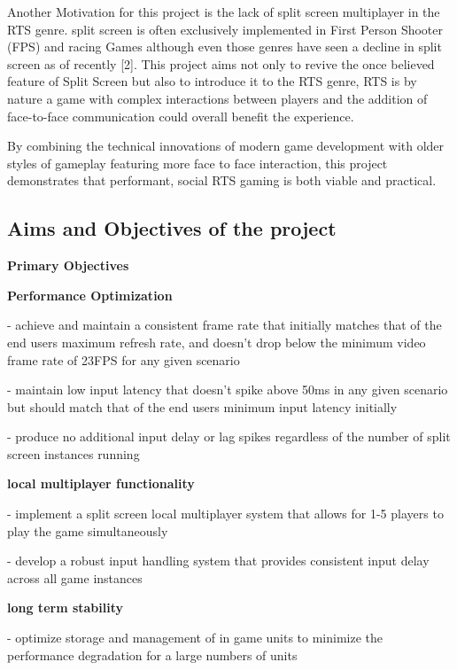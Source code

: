 \documentclass[]{final_report}
\begin{document}
Another Motivation for this project is the lack of split screen multiplayer in the RTS genre. split screen is often exclusively implemented in First Person Shooter (FPS) and racing Games although even those genres have seen a decline in split screen as of recently [2]. This project aims not only to revive the once believed feature of Split Screen but also to introduce it to the RTS genre, RTS is by nature a game with complex interactions between players and the addition of face-to-face communication could overall benefit the experience. \newline

By combining the technical innovations of modern game development with older styles of gameplay featuring more face to face interaction, this project demonstrates that performant, social RTS gaming is both viable and practical.


\subsection{ Aims and Objectives of the project}

 \textbf{Primary Objectives} \newline

\textbf{ Performance Optimization} \newline

 - achieve and maintain a consistent frame rate that initially matches that of the end users maximum refresh rate, and doesn’t drop below the minimum video frame rate of 23FPS for any given scenario 

 - maintain low input latency that doesn’t spike above 50ms in any given scenario but should match that of the end users minimum input latency initially

 - produce no additional input delay or lag spikes regardless of the number of split screen instances running

 \textbf{local multiplayer functionality} \newline

 - implement a split screen local multiplayer system that allows for 1-5 players to play the game simultaneously

 - develop a robust input handling system that provides consistent input delay across all game instances

 \textbf{long term stability} \newline

 - optimize storage and management of in game units to minimize the performance degradation for a large numbers of units
\end{document}
